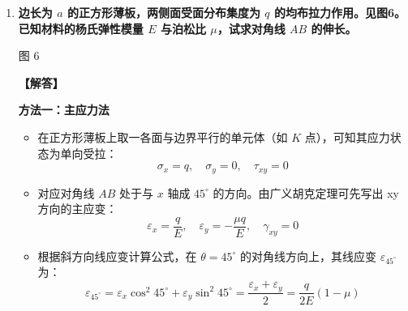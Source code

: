 \documentclass[11pt,a4paper]{ctexrep}
\begin{document}
{\begin{enumerate}
\textbf{(4) 强度条件约束}
对于 $AC$ 段：
\[
\tau_{1, \max} = \frac{M_1}{W_{p1}} = \frac{0.72 M_{ec}}{\frac{\pi}{16}D_1^3} \le [\tau] \implies M_{ec} \le \frac{60 \times 10^6 \times \frac{\pi}{16} \times 0.07^3}{0.72} \approx 5.6 \times 10^3\text{ N}\cdot\text{m}
\]
对于 $BC$ 段：
\[
\tau_{2, \max} = \frac{M_2}{W_{p2}} = \frac{0.28 M_{ec}}{\frac{\pi}{16}D_2^3} \le [\tau] \implies M_{ec} \le \frac{60 \times 10^6 \times \frac{\pi}{16} \times 0.05^3}{0.28} \approx 5.3 \times 10^3\text{ N}\cdot\text{m}
\]
综合两段的强度要求，取其较小值，以保证全轴安全：
\[
[M_{ec}] = 5.3\text{ kN}\cdot\text{m}
\]




\item \textbf{边长为 $a$ 的正方形薄板，两侧面受面分布集度为 $q$ 的均布拉力作用。见图6。已知材料的杨氏弹性模量 $E$ 与泊松比 $\mu$，试求对角线 $AB$ 的伸长。}

\begin{center}
\par\small 图 6
\end{center}

\textbf{【解答】}

\textbf{方法一：主应力法}
\begin{itemize}
    \item 在正方形薄板上取一各面与边界平行的单元体（如 $K$ 点），可知其应力状态为单向受拉：
    \[
    \sigma_x = q,\quad \sigma_y = 0,\quad \tau_{xy} = 0
    \]
    \item 对应对角线 $AB$ 处于与 $x$ 轴成 $45^\circ$ 的方向。由广义胡克定理可先写出 xy 方向的主应变：
    \[
    \varepsilon_x = \frac{q}{E},\quad \varepsilon_y = -\frac{\mu q}{E},\quad \gamma_{xy} = 0
    \]
    \item 根据斜方向线应变计算公式，在 $\theta = 45^\circ$ 的对角线方向上，其线应变 $\varepsilon_{45^\circ}$ 为：
    \[
    \varepsilon_{45^\circ} = \varepsilon_x \cos^2 45^\circ + \varepsilon_y \sin^2 45^\circ = \frac{\varepsilon_x + \varepsilon_y}{2} = \frac{q}{2E}(1 - \mu)
    \]
\end{itemize}


\end{enumerate}}
\end{document}
